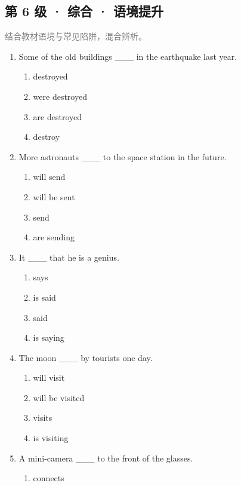 \documentclass[11pt,a4paper]{ctexart}
\begin{document}
\subsection*{第 6 级 · 综合 · 语境提升}
\noindent\textcolor{gray}{结合教材语境与常见陷阱，混合辨析。}\par\smallskip
\begin{enumerate}[leftmargin=*,itemsep=4pt]
\item Some of the old buildings \_\_\_ in the earthquake last year.
\begin{enumerate}[label=\Alph*.,leftmargin=2em,itemsep=1pt,topsep=2pt]
\item destroyed
\item were destroyed
\item are destroyed
\item destroy
\end{enumerate}
\item More astronauts \_\_\_ to the space station in the future.
\begin{enumerate}[label=\Alph*.,leftmargin=2em,itemsep=1pt,topsep=2pt]
\item will send
\item will be sent
\item send
\item are sending
\end{enumerate}
\item It \_\_\_ that he is a genius.
\begin{enumerate}[label=\Alph*.,leftmargin=2em,itemsep=1pt,topsep=2pt]
\item says
\item is said
\item said
\item is saying
\end{enumerate}
\item The moon \_\_\_ by tourists one day.
\begin{enumerate}[label=\Alph*.,leftmargin=2em,itemsep=1pt,topsep=2pt]
\item will visit
\item will be visited
\item visits
\item is visiting
\end{enumerate}
\item A mini-camera \_\_\_ to the front of the glasses.
\begin{enumerate}[label=\Alph*.,leftmargin=2em,itemsep=1pt,topsep=2pt]
\item connects

\end{enumerate}
\end{enumerate}
\end{document}
